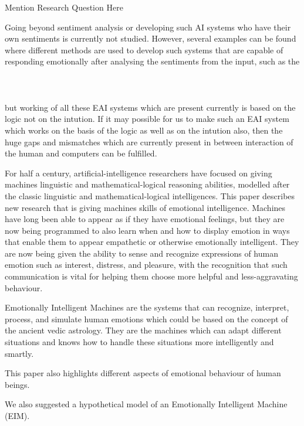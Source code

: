 Mention Research Question Here

Going beyond sentiment analysis or developing such AI systems who have their own sentiments is currently not studied. However, several examples can be found where different methods are used to develop such systems that are capable of responding emotionally after analysing the sentiments from the input, such as the \\\\\\\\
but working of all these EAI systems which are present currently is based on the logic not on the intution. If it may possible for us to make such an EAI system which works on the basis of the logic as well as on the intution also, then the huge gaps and mismatches which are currently present in between interaction of the human and computers can be fulfilled.

For half a century, artificial-intelligence researchers have focused on giving machines linguistic and mathematical-logical reasoning abilities, modelled after the classic linguistic and mathematical-logical intelligences. This paper describes new research that is giving machines skills of emotional intelligence. Machines have long been able to appear as if they have emotional feelings, but they are now being programmed to also learn when and how to display emotion in ways that enable them to appear empathetic or otherwise emotionally intelligent. They are now being given the ability to sense and recognize expressions of human emotion such as interest, distress, and pleasure, with the recognition that such communication is vital for helping them choose more helpful and less-aggravating behaviour.

Emotionally Intelligent Machines are the systems that can recognize, interpret, process, and simulate human emotions which could be based on the concept of the ancient vedic astrology. They are the machines which can adapt different situations and knows how to handle these situations more intelligently and smartly.

This paper also highlights different aspects of emotional behaviour of human beings.

We also suggested a hypothetical model of an Emotionally Intelligent Machine (EIM).